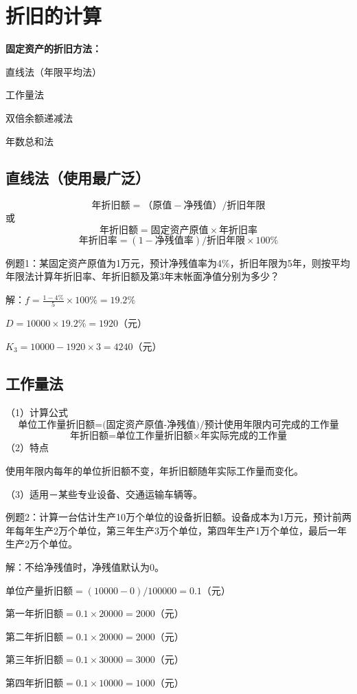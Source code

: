 \section{折旧的计算}
\noindent \textbf{固定资产的折旧方法：}

直线法（年限平均法）

工作量法

双倍余额递减法

年数总和法

\subsection{直线法（使用最广泛）}
$$\mbox{年折旧额}=\mbox{（原值}-\mbox{净残值）}/\mbox{折旧年限}$$
或
$$\mbox{年折旧额}=\mbox{固定资产原值} \times \mbox{年折旧率}$$
$$\mbox{年折旧率}=(1-\mbox{净残值率})/\mbox{折旧年限}×100\%$$

例题1：某固定资产原值为1万元，预计净残值率为4\%，折旧年限为5年，则按平均年限法计算年折旧率、年折旧额及第3年末帐面净值分别为多少？

解：$f=\frac{1-4\%}{5} \times 100\% = 19.2\%$

$D=10000 \times 19.2\%=1920$（元）

$K_3=10000-1920 \times 3=4240$（元）


\subsection{工作量法}
（1）计算公式
$$\mbox{单位工作量折旧额=(固定资产原值-净残值)/预计使用年限内可完成的工作量}$$
$$\mbox{年折旧额=单位工作量折旧额} \times \mbox{年实际完成的工作量}$$
（2）特点

使用年限内每年的单位折旧额不变，年折旧额随年实际工作量而变化。

（3）适用－某些专业设备、交通运输车辆等。

例题2：计算一台估计生产10万个单位的设备折旧额。设备成本为1万元，预计前两年每年生产2万个单位，第三年生产3万个单位，第四年生产1万个单位，最后一年生产2万个单位。

解：不给净残值时，净残值默认为0。

单位产量折旧额$=(10000-0)/100000=0.1$（元）

第一年折旧额$=0.1 \times 20000 = 2000$（元）

第二年折旧额$=0.1 \times 20000 = 2000$（元）

第三年折旧额$=0.1 \times 30000 = 3000$（元）

第四年折旧额$=0.1 \times 10000 = 1000$（元）

